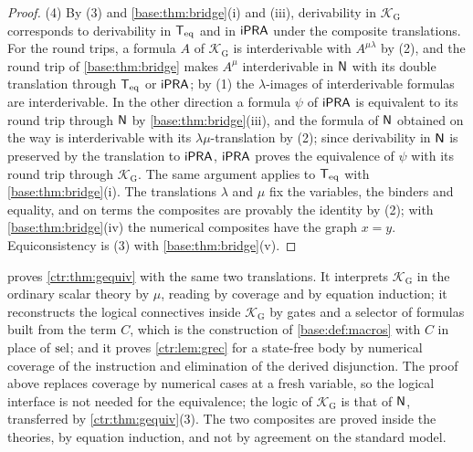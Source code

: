\begin{proof}
(4) By (3) and \cref{base:thm:bridge}(i) and (iii), derivability in
$\mathcal K_{\mathrm G}$ corresponds to derivability in $\mathsf{T}_{\mathrm{eq}}$ and in $\mathsf{iPRA}$ under the
composite translations. For the round trips, a formula $A$ of $\mathcal K_{\mathrm G}$ is
interderivable with $A^{\mu\lambda}$ by (2), and the round trip of \cref{base:thm:bridge}
makes $A^\mu$ interderivable in $\mathsf{N}$ with its double translation through $\mathsf{T}_{\mathrm{eq}}$ or
$\mathsf{iPRA}$; by (1) the $\lambda$-images of interderivable formulas are interderivable. In the
other direction a formula $\psi$ of $\mathsf{iPRA}$ is equivalent to its round trip through $\mathsf{N}$
by \cref{base:thm:bridge}(iii), and the formula of $\mathsf{N}$ obtained on the way is
interderivable with its $\lambda\mu$-translation by (2); since derivability in $\mathsf{N}$ is
preserved by the translation to $\mathsf{iPRA}$, $\mathsf{iPRA}$ proves the equivalence of $\psi$ with its
round trip through $\mathcal K_{\mathrm G}$. The same argument applies to $\mathsf{T}_{\mathrm{eq}}$ with
\cref{base:thm:bridge}(i). The translations $\lambda$ and $\mu$ fix the variables, the
binders and equality, and on terms the composites are provably the identity by (2); with
\cref{base:thm:bridge}(iv) the numerical composites have the graph $x=y$. Equiconsistency
is (3) with \cref{base:thm:bridge}(v).
\end{proof}

\begin{remark}\label{ctr:rem:groute}
 proves \cref{ctr:thm:gequiv} with the same two translations. It
interprets $\mathcal K_{\mathrm G}$ in the ordinary scalar theory by $\mu$, reading
 by coverage and  by equation induction; it reconstructs the
logical connectives inside $\mathcal K_{\mathrm G}$ by gates and a selector of formulas built
from the term $C$, which is the construction of \cref{base:def:macros} with $C$ in place of
$\operatorname{sel}$; and it proves \cref{ctr:lem:grec} for a state-free body by numerical coverage of the
instruction and elimination of the derived disjunction. The proof above replaces coverage by
numerical cases at a fresh variable, so the logical interface is not needed for the
equivalence; the logic of $\mathcal K_{\mathrm G}$ is that of $\mathsf{N}$, transferred by
\cref{ctr:thm:gequiv}(3). The two composites are proved inside the theories, by equation
induction, and not by agreement on the standard model.
\end{remark}

